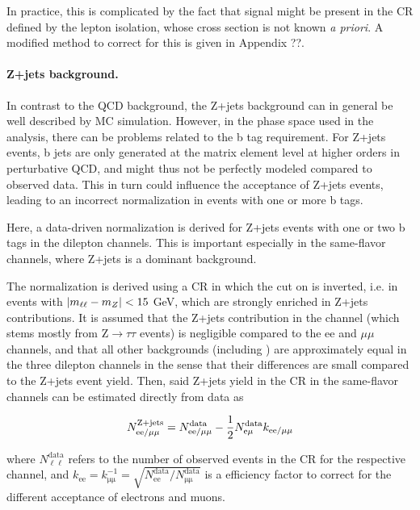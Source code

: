 In practice, this is complicated by the fact that \ttbar signal might be present in the CR defined by the lepton isolation, whose cross section is not known \textit{a priori}. A modified method to correct for this is given in Appendix ??.

\paragraph{Z+jets background.}

In contrast to the QCD background, the Z+jets background can in general be well described by MC simulation. However, in the phase space used in the analysis, there can be problems related to the b tag requirement. For Z+jets events, b jets are only generated at the matrix element level at higher orders in perturbative QCD, and might thus not be perfectly modeled compared to observed data. This in turn could influence the acceptance of Z+jets events, leading to an incorrect normalization in events with one or more b tags.

Here, a data-driven normalization is derived for Z+jets events with one or two b tags in the dilepton channels. This is important especially in the same-flavor channels, where Z+jets is a dominant background.

The normalization is derived using a CR in which the cut on \mll is inverted, i.e. in events with $| m_{\ell\ell} - m_Z | < 15$ GeV, which are strongly enriched in Z+jets contributions. It is assumed that the Z+jets contribution in the \emu channel (which stems mostly from $\mathrm{Z} \rightarrow \tau \tau$ events) is negligible compared to the ee and $\mu \mu$ channels, and that all other backgrounds (including \ttbar) are approximately equal in the three dilepton channels in the sense that their differences are small compared to the Z+jets event yield. Then, said Z+jets yield in the CR in the same-flavor channels can be estimated directly from data as

\begin{equation}
\label{eq:ttxs:zjets_yield}
    N_{\mathrm{ee / \mu\mu}}^{\mathrm{Z+jets}} = N_{\mathrm{ee / \mu\mu}}^{\mathrm{data}} - \frac{1}{2} N_{\mathrm{\mathrm{e\mu}}}^{\mathrm{data}} k_{\mathrm{ee / \mu\mu}}
\end{equation}

where $N_{\mathrm{\ell \ell}}^{\mathrm{data}}$ refers to the number of observed events in the CR for the respective channel, and $k_{\mathrm{ee}} = k_{\mathrm{\mu\mu}}^{-1} = \sqrt{N_{\mathrm{ee}}^{\mathrm{data}} / N_{\mathrm{\mu\mu}}^{\mathrm{data}}}$ is a efficiency factor to correct for the different acceptance of electrons and muons.

